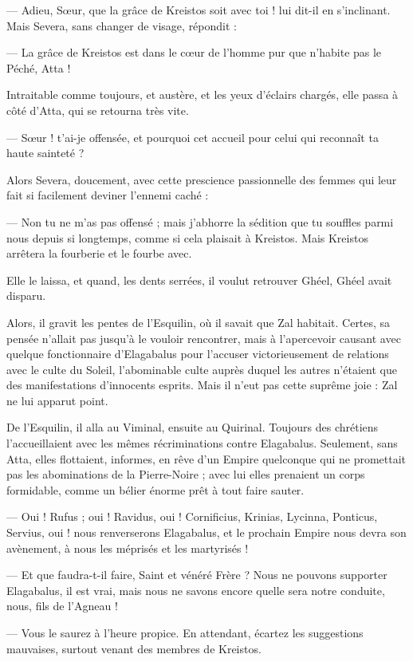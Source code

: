 \documentclass[a4paper, 11pt, oneside, polutonikogreek, french]{article}
\begin{document}
--- Adieu, Sœur, que la grâce de Kreistos soit avec toi ! lui dit-il en s'inclinant. Mais Severa, sans changer de visage, répondit :

--- La grâce de Kreistos est dans le cœur de l'homme pur que n'habite pas le Péché, Atta !

Intraitable comme toujours, et austère, et les yeux d'éclairs chargés, elle passa à côté d'Atta, qui se retourna très vite.

--- Sœur ! t'ai-je offensée, et pourquoi cet accueil pour celui qui reconnaît ta haute sainteté ?

Alors Severa, doucement, avec cette prescience passionnelle des femmes qui leur fait si facilement deviner l'ennemi caché :

--- Non tu ne m'as pas offensé ; mais j'abhorre la sédition que tu souffles parmi nous depuis si longtemps, comme si cela plaisait à Kreistos. Mais Kreistos arrêtera la fourberie et le fourbe avec.

Elle le laissa, et quand, les dents serrées, il voulut retrouver Ghéel, Ghéel avait disparu.

Alors, il gravit les pentes de l'Esquilin, où il savait que Zal habitait. Certes, sa pensée n'allait pas jusqu'à le vouloir rencontrer, mais à l'apercevoir causant avec quelque fonctionnaire d'Elagabalus pour l'accuser victorieusement de relations avec le culte du Soleil, l'abominable culte auprès duquel les autres n'étaient que des manifestations d'innocents esprits. Mais il n'eut pas cette suprême joie : Zal ne lui apparut point.

De l'Esquilin, il alla au Viminal, ensuite au Quirinal. Toujours des chrétiens l'accueillaient avec les mêmes récriminations contre Elagabalus. Seulement, sans Atta, elles flottaient, informes, en rêve d'un Empire quelconque qui ne promettait pas les abominations de la Pierre-Noire ; avec lui elles prenaient un corps formidable, comme un bélier énorme prêt à tout faire sauter.

--- Oui ! Rufus ; oui ! Ravidus, oui ! Cornificius, Krinias, Lycinna, Ponticus, Servius, oui ! nous renverserons Elagabalus, et le prochain Empire nous devra son avènement, à nous les méprisés et les martyrisés !

--- Et que faudra-t-il faire, Saint et vénéré Frère ? Nous ne pouvons supporter Elagabalus, il est vrai, mais nous ne savons encore quelle sera notre conduite, nous, fils de l'Agneau !

--- Vous le saurez à l'heure propice. En attendant, écartez les suggestions mauvaises, surtout venant des membres de Kreistos.
\end{document}
